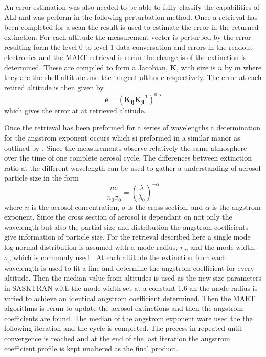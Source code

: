 \documentclass[12pt]{article}
\begin{document}
An error estimation was also needed to be able to fully classify the capabilities of ALI and was perform in the following perturbation method. Once a retrieval has been completed for a scan the result is used to estimate the error in the returned extinction. For each altitude the measurement vector is perturbed by the error resulting form the level 0 to level 1 data conversation and errors in the readout electronics and the MART retrieval is rerun the change is of the extinction is determined. These are compiled to form a Jacobian, $\mathbf{K}$, with size is $n$ by $m$ where they are the shell altitude and the tangent altitude respectively. The error at each retired altitude is then given by
\begin{equation}
    \mathbf{e} = \left(\mathbf{K_{ij}}\mathbf{K_{ji}^{-1}}\right)^{0.5}
\end{equation}
which gives the error at at retrieved altitude.

Once the retrieval has been preformed for a series of wavelengths a determination for the angstrom exponent occurs which si preformed in a similar manor as outlined by \cite{Rault2013}. Since the measurements observe relatively the same atmosphere over the time of one complete aerosol cycle. The differences between extinction ratio at the different wavelength can be used to gather a understanding of aerosol particle size in the form
\begin{equation}
    \frac{n\sigma}{n_{0}\sigma_{0}} = \left(\frac{\lambda}{\lambda_{0}}\right)^{-\alpha}
    \label{eqn:agstromCoefficient}
\end{equation}
where $n$ is the aerosol concentration, $\sigma$ is the cross section, and $\alpha$ is the angstrom exponent. Since the cross section of aerosol is dependant on not only the wavelength but also the partial size and distribution the angstrom coefficients give information of particle size. For the retrieval described here a single mode log-normal distribution is assumed with a mode radius, $r_{g}$, and the mode width, $\sigma_{g}$ which is commonly used \citep{Bingen2004}. At each altitude the extinction from each wavelength is used to fit a line and determine the angstrom coefficient for every altitude. Then the median value from altitudes is used as the new size parameters in SASKTRAN with the mode width set at a constant 1.6 an the mode radius is varied to achieve an identical angstrom coefficient determined. Then the MART algorithms is rerun to update the aerosol extinctions and then the angstrom coefficients are found. The median of the angstrom exponent ware used the the following iteration and the cycle is completed. The precess in repeated until convergence is reached and at the end of the last iteration the angstrom coefficient profile is kept unaltered as the final product.
\end{document}
